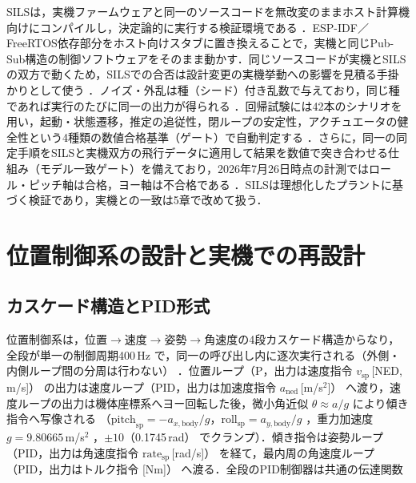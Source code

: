 \documentclass[a4paper,twocolumn,10pt]{ltjsarticle}
\begin{document}
SILSは，実機ファームウェアと同一のソースコードを無改変のままホスト計算機向けにコンパイルし，決定論的に実行する検証環境である%
．ESP-IDF／FreeRTOS依存部分をホスト向けスタブに置き換えることで，実機と同じPub-Sub構造の制御ソフトウェアをそのまま動かす．同じソースコードが実機とSILSの双方で動くため，SILSでの合否は設計変更の実機挙動への影響を見積る手掛かりとして使う%
．ノイズ・外乱は種（シード）付き乱数で与えており，同じ種であれば実行のたびに同一の出力が得られる%
．回帰試験には42本のシナリオを用い，起動・状態遷移，推定の追従性，閉ループの安定性，アクチュエータの健全性という4種類の数値合格基準（ゲート）で自動判定する%
．さらに，同一の同定手順をSILSと実機双方の飛行データに適用して結果を数値で突き合わせる仕組み（モデル一致ゲート）を備えており，2026年7月26日時点の計測ではロール・ピッチ軸は合格，ヨー軸は不合格である%
．SILSは理想化したプラントに基づく検証であり，実機との一致は5章で改めて扱う．

\section{位置制御系の設計と実機での再設計}
\label{sec:design}

\subsection{カスケード構造とPID形式}

位置制御系は，位置$\rightarrow$速度$\rightarrow$姿勢$\rightarrow$角速度の4段カスケード構造からなり，
全段が単一の制御周期400\,Hz%
で，同一の呼び出し内に逐次実行される（外側・内側ループ間の分周は行わない）%
．位置ループ（P，出力は速度指令 $v_\mathrm{sp}$\,[NED, m/s]）%
の出力は速度ループ（PID，出力は加速度指令 $a_\mathrm{ned}$\,[m/s$^2$]）%
へ渡り，速度ループの出力は機体座標系へヨー回転した後，微小角近似
$\theta \approx a/g$ により傾き指令へ写像される
（$\mathrm{pitch}_\mathrm{sp}=-a_{x,\mathrm{body}}/g$，$\mathrm{roll}_\mathrm{sp}=a_{y,\mathrm{body}}/g$%
，重力加速度 $g=9.80665$\,m/s$^2$%
，$\pm 10$\textdegree（0.1745\,rad）%
でクランプ）．傾き指令は姿勢ループ（PID，出力は角速度指令 $\mathrm{rate}_\mathrm{sp}$\,[rad/s]）%
を経て，最内周の角速度ループ（PID，出力はトルク指令 [Nm]）%
へ渡る．全段のPID制御器は共通の伝達関数
\end{document}
